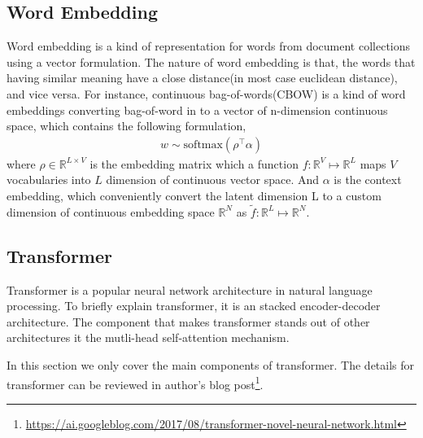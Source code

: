 \subsection{Word Embedding} \label{ch2:we}
Word embedding\cite{bengio_neural_nodate} is a kind of representation for words from document collections using a vector formulation. The nature of word embedding is that, the words that having similar meaning have a close distance(in most case euclidean distance), and vice versa. For instance, continuous bag-of-words(CBOW) \cite{mikolov_distributed_nodate} is a kind of word embeddings converting bag-of-word in to a vector of n-dimension continuous space, which contains the following formulation,
\begin{align*}
w\sim\text{softmax}(\rho^\top\alpha)
\end{align*}
where $ \rho\in\mathbb{R}^{L\times V} $ is the embedding matrix which a function $ f:\mathbb{R}^V\mapsto\mathbb{R}^{L} $ maps $ V $ vocabularies into $ L $ dimension of continuous vector space. And $ \alpha $ is the context embedding, which conveniently convert the latent dimension L to a custom dimension of continuous embedding space $ \mathbb{R}^{N} $ as $ \tilde{f}:\mathbb{R}^L\mapsto\mathbb{R}^{N} $.
\subsection{Transformer} \label{ch2:transformer}
Transformer\cite{vaswani_attention_nodate} is a popular neural network architecture in natural language processing. To briefly explain transformer, it is an stacked encoder-decoder architecture. The component that makes transformer stands out of other architectures it the mutli-head self-attention mechanism. 

In this section we only cover the main components of transformer. The details for transformer can be reviewed in author's blog post\footnote{\url{https://ai.googleblog.com/2017/08/transformer-novel-neural-network.html}}.


